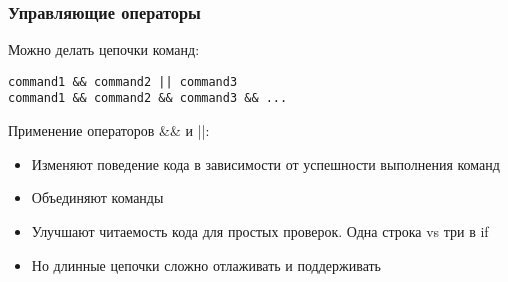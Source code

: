 \begin{frame}[fragile]
\frametitle{Управляющие операторы}
Можно делать цепочки команд:
\begin{verbatim}
command1 && command2 || command3 
command1 && command2 && command3 && ...
\end{verbatim}

Применение операторов \&\& и ||:
\begin{itemize}
    \item Изменяют поведение кода в зависимости от успешности выполнения команд
    \item Объединяют команды
    \item Улучшают читаемость кода для простых проверок.  Одна строка vs три в if
    \item Но длинные цепочки сложно отлаживать и поддерживать
\end{itemize}

\end{frame}
